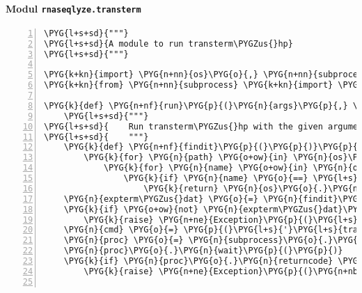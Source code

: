 \paragraph{Modul \texttt{rnaseqlyze.transterm}}
\label{rnaseqlyze-pdf:modul-rnaseqlyze-transterm}
\begin{Verbatim}[commandchars=\\\{\},numbers=left,firstnumber=1,stepnumber=5]
\PYG{l+s+sd}{"""}
\PYG{l+s+sd}{A module to run transterm\PYGZus{}hp}
\PYG{l+s+sd}{"""}

\PYG{k+kn}{import} \PYG{n+nn}{os}\PYG{o}{,} \PYG{n+nn}{subprocess}
\PYG{k+kn}{from} \PYG{n+nn}{subprocess} \PYG{k+kn}{import} \PYG{n}{PIPE}

\PYG{k}{def} \PYG{n+nf}{run}\PYG{p}{(}\PYG{n}{args}\PYG{p}{,} \PYG{n}{out}\PYG{o}{=}\PYG{n+nb+bp}{None}\PYG{p}{,} \PYG{n}{err}\PYG{o}{=}\PYG{n+nb+bp}{None}\PYG{p}{)}\PYG{p}{:}
    \PYG{l+s+sd}{"""}
\PYG{l+s+sd}{    Run transterm\PYGZus{}hp with the given arguments plus "-p expterm.dat"}
\PYG{l+s+sd}{    """}
    \PYG{k}{def} \PYG{n+nf}{findit}\PYG{p}{(}\PYG{p}{)}\PYG{p}{:}
        \PYG{k}{for} \PYG{n}{path} \PYG{o+ow}{in} \PYG{n}{os}\PYG{o}{.}\PYG{n}{getenv}\PYG{p}{(}\PYG{l+s}{"}\PYG{l+s}{PATH}\PYG{l+s}{"}\PYG{p}{)}\PYG{o}{.}\PYG{n}{split}\PYG{p}{(}\PYG{n}{os}\PYG{o}{.}\PYG{n}{path}\PYG{o}{.}\PYG{n}{pathsep}\PYG{p}{)}\PYG{p}{:}
            \PYG{k}{for} \PYG{n}{name} \PYG{o+ow}{in} \PYG{n}{os}\PYG{o}{.}\PYG{n}{listdir}\PYG{p}{(}\PYG{n}{os}\PYG{o}{.}\PYG{n}{path}\PYG{o}{.}\PYG{n}{join}\PYG{p}{(}\PYG{n}{path}\PYG{p}{,} \PYG{l+s}{"}\PYG{l+s}{../lib}\PYG{l+s}{"}\PYG{p}{)}\PYG{p}{)}\PYG{p}{:}
                \PYG{k}{if} \PYG{n}{name} \PYG{o}{==} \PYG{l+s}{'}\PYG{l+s}{expterm.dat}\PYG{l+s}{'}\PYG{p}{:}
                    \PYG{k}{return} \PYG{n}{os}\PYG{o}{.}\PYG{n}{path}\PYG{o}{.}\PYG{n}{join}\PYG{p}{(}\PYG{n}{path}\PYG{p}{,} \PYG{l+s}{"}\PYG{l+s}{../lib}\PYG{l+s}{"}\PYG{p}{,} \PYG{n}{name}\PYG{p}{)}
    \PYG{n}{expterm\PYGZus{}dat} \PYG{o}{=} \PYG{n}{findit}\PYG{p}{(}\PYG{p}{)}
    \PYG{k}{if} \PYG{o+ow}{not} \PYG{n}{expterm\PYGZus{}dat}\PYG{p}{:}
        \PYG{k}{raise} \PYG{n+ne}{Exception}\PYG{p}{(}\PYG{l+s}{"}\PYG{l+s}{'}\PYG{l+s}{expterm.dat}\PYG{l+s}{'}\PYG{l+s}{ not found}\PYG{l+s}{"}\PYG{p}{)}
    \PYG{n}{cmd} \PYG{o}{=} \PYG{p}{(}\PYG{l+s}{'}\PYG{l+s}{transterm}\PYG{l+s}{'}\PYG{p}{,} \PYG{l+s}{'}\PYG{l+s}{-p}\PYG{l+s}{'}\PYG{p}{,} \PYG{n}{expterm\PYGZus{}dat}\PYG{p}{)} \PYG{o}{+} \PYG{n+nb}{tuple}\PYG{p}{(}\PYG{n}{args}\PYG{p}{)}
    \PYG{n}{proc} \PYG{o}{=} \PYG{n}{subprocess}\PYG{o}{.}\PYG{n}{Popen}\PYG{p}{(}\PYG{n}{cmd}\PYG{p}{,} \PYG{n}{stdout}\PYG{o}{=}\PYG{n}{out}\PYG{p}{,} \PYG{n}{stderr}\PYG{o}{=}\PYG{n}{err}\PYG{p}{)}
    \PYG{n}{proc}\PYG{o}{.}\PYG{n}{wait}\PYG{p}{(}\PYG{p}{)}
    \PYG{k}{if} \PYG{n}{proc}\PYG{o}{.}\PYG{n}{returncode} \PYG{o}{!=} \PYG{l+m+mi}{0}\PYG{p}{:}
        \PYG{k}{raise} \PYG{n+ne}{Exception}\PYG{p}{(}\PYG{n+nb}{str}\PYG{p}{(}\PYG{n}{cmd}\PYG{p}{)} \PYG{o}{+} \PYG{l+s}{"}\PYG{l+s}{ failed}\PYG{l+s}{"}\PYG{p}{)}


\end{Verbatim}

